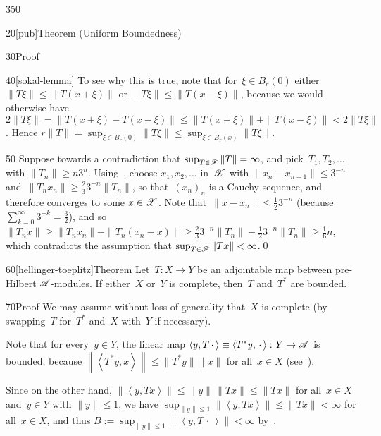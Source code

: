 \begin{parsec}{350}
\begin{point}{20}[pub]{Theorem (Uniform Boundedness)}
\begin{point}{30}{Proof}
\begin{point}{40}[sokal-lemma]
To see why this is true,
note that for~$\xi\in B_r(0)$
either $\|T\xi\|\leq \|T(x+\xi)\|$
or $\|T\xi\|\leq \|T(x-\xi)\|$,
because we would otherwise have
$2\|T\xi\| = \|T(x+\xi)-T(x-\xi)\|
\leq \|T(x+\xi)\|+\|T(x-\xi)\|<2\|T\xi\|$.
Hence
$r\|T\|=\sup_{\xi\in B_r(0)} \|T\xi\|\leq  
\sup_{\xi \in B_r(x)} \|T\xi \|$.
\end{point}
\begin{point}{50}%
Suppose towards a contradiction
that $\sup_{T\in\mathscr{F}}\|T\|=\infty$,
and pick~$T_1,T_2,\dotsc$ with $\|T_n\|\geq n3^{n}$.
Using~,
choose $x_1,x_2,\dotsc$ in~$\mathscr{X}$
with $\|x_{n}-x_{n-1}\|\leq 3^{-n}$
and~$\|T_{n} x_{n}\|\geq \frac{2}{3}3^{-n}\|T_{n}\|$,
so that~$(x_n)_n$ is a Cauchy sequence, 
and therefore converges to some
$x\in\mathscr{X}$.
Note that~$\|x-x_n\|\leq \frac{1}{2}3^{-n}$
(because $\sum_{k=0}^\infty 3^{-k}=\frac{3}{2}$),
and so $\|T_n x\|\geq  \|T_nx_n\| - \|T_n(x_n-x)\|
\geq \frac{2}{3}3^{-n}\|T_n\|-\frac{1}{2}3^{-n}\|T_n\|
\geq \frac{1}{6}n$,
which contradicts
the assumption that $\sup_{T\in \mathscr{F}} \|Tx\| <\infty$.\qed
\end{point}
\end{point}
\end{point}
\begin{point}{60}[hellinger-toeplitz]{Theorem}%
Let~$T\colon X\to Y$ be an adjointable map
between pre-Hilbert $\mathscr{A}$-modules.
If either~$X$ or~$Y$ is complete,
then~$T$ and~$T^*$ are bounded.
\begin{point}{70}{Proof}%
We may assume without loss of generality
that~$X$ is complete (by swapping~$T$ for~$T^*$
and~$X$ with~$Y$ if necessary).

Note that for every~$y\in Y$,
the linear map $\left<y,T\,\cdot\,\right>\equiv
\left<T^*y,\,\cdot\,\right>\colon Y\to \mathscr{A}$
is bounded,
because $\left\|\left<T^*y,x\right>\right\| \leq \|T^*y\|\|x\|$
for all~$x\in X$ (see~).

Since 
on the other hand,
$\left\|\left<y,Tx\right>\right\|
\leq \|y\|\,\|Tx\|\leq \|Tx\|$
for all~$x\in X$ and~$y\in Y$ with $\|y\|\leq 1$,
we have $\sup_{\|y\|\leq 1} \|\left<y,Tx\right>\| \leq \|Tx\|<\infty$
for all~$x\in X$,
and thus $B:=\sup_{\|y\|\leq 1} \|\left<y,T\,\cdot\,\right>\|<\infty$
by~.


\end{point}
\end{point}
\end{parsec}
